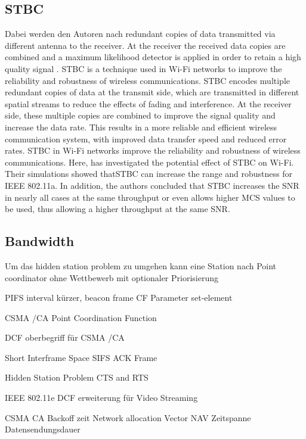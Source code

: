 \documentclass[]{nsm-thesis}
\begin{document}
\subsection{\ac{STBC}}
Dabei werden den Autoren nach redundant copies of data transmitted via different antenna to the receiver. At the receiver the received data copies are combined and a maximum likelihood detector is applied in order to retain a high quality signal \cite{Santumon}.
\ac{STBC} is a technique used in Wi-Fi networks to improve the reliability and robustness of wireless communications. \ac{STBC} encodes multiple redundant copies of data at the transmit side, which are transmitted in different spatial streams to reduce the effects of fading and interference. At the receiver side, these multiple copies are combined to improve the signal quality and increase the data rate. This results in a more reliable and efficient wireless communication system, with improved data transfer speed and reduced error rates.
\ac{STBC} in Wi-Fi networks improve the reliability and robustness of wireless communications.
Here, \textcite{Stamoulis} has investigated the potential effect of \ac{STBC} on Wi-Fi. Their simulations showed that\ac{STBC} can increase the range and robustness for IEEE 802.11a. In addition, the authors concluded  that \ac{STBC} increases the \ac{SNR} in nearly all cases at the same throughput or even allows higher \ac{MCS} values to be used, thus allowing a higher throughput at the same \ac{SNR}. 



\subsection{Bandwidth}
Um das hidden station problem zu umgehen kann eine Station nach \textcite{sauter_wireless_2022} 
Point coordinator 
ohne Wettbewerb mit optionaler Priorisierung

PIFS interval kürzer, 
beacon frame
CF Parameter set-element

CSMA /CA
Point Coordination Function

\textcite{sauter_wireless_2022}
DCF oberbegriff für CSMA /CA
 
 
Short Interframe Space SIFS ACK Frame 
 
Hidden Station Problem 
CTS and RTS
 
IEEE 802.11e DCF erweiterung für Video Streaming

CSMA CA Backoff zeit
Network allocation Vector NAV Zeitspanne Datensendungsdauer
\end{document}
